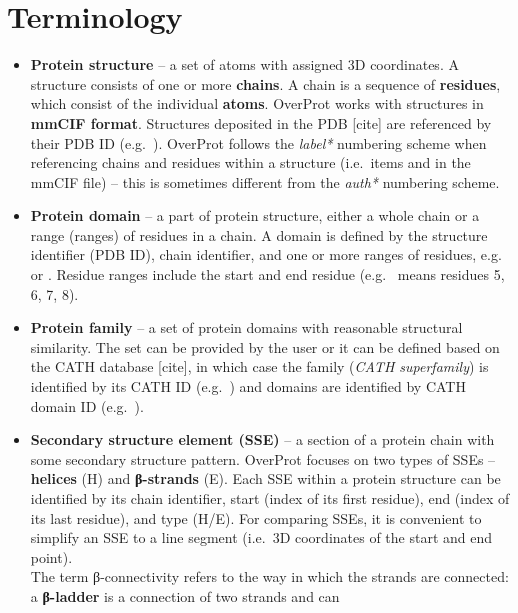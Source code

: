 \documentclass{article}
\begin{document}
\section{Terminology}

\begin{itemize}
  \item
    \textbf{Protein structure} -- a set of atoms with assigned 3D
    coordinates. A structure consists of one or more \textbf{chains}. A
    chain is a sequence of \textbf{residues}, which consist of the
    individual \textbf{atoms}. OverProt works with structures in
    \textbf{mmCIF format}. Structures deposited in the PDB {[}cite{]} are
    referenced by their PDB ID (e.g.~). OverProt follows the
    \emph{label*} numbering scheme when referencing chains and residues
    within a structure (i.e.~items  and
     in the mmCIF file) -- this is sometimes
    different from the \emph{auth*} numbering scheme.
  \item
    \textbf{Protein domain} -- a part of protein structure, either a
    whole chain or a range (ranges) of residues in a chain. A domain is
    defined by the structure identifier (PDB ID), chain identifier, and one or more
    ranges of residues, e.g.~ or
    . Residue ranges include the start and end
    residue (e.g.~ means residues 5, 6, 7, 8).
  \item
    \textbf{Protein family} -- a set of protein domains with reasonable
    structural similarity. The set can be provided by the user or it can
    be defined based on the CATH database {[}cite{]}, in which case the
    family (\emph{CATH superfamily}) is identified by its CATH ID
    (e.g.~) and domains are identified by CATH domain
    ID (e.g.~).
  \item
    \textbf{Secondary structure element (SSE)} -- a section of a protein
    chain with some secondary structure pattern. OverProt focuses on two
    types of SSEs -- \textbf{helices} (H) and \textbf{β-strands} (E). Each
    SSE within a protein structure can be identified by its chain
    identifier, start (index of its first residue), end (index of its last
    residue), and type (H/E). For comparing SSEs, it is convenient to simplify
    an SSE to a line segment (i.e.~3D coordinates of the start and end
    point).\\
    The term β-connectivity refers to the way in which the strands are
    connected: a \textbf{β-ladder} is a connection of two strands and can

\end{itemize}
\end{document}
